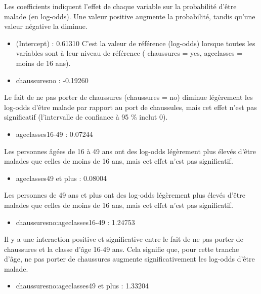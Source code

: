 \documentclass[
]{article}
\providecommand{\tightlist}{%
  \setlength{\itemsep}{0pt}\setlength{\parskip}{0pt}}
\begin{document}
{{Les coefficients indiquent l'effet de chaque variable sur la probabilité
d'être malade (en log-odds). Une valeur positive augmente la
probabilité, tandis qu'une valeur négative la diminue.

\begin{itemize}
\item
  (Intercept) : 0.61310 C'est la valeur de référence (log-odds) lorsque
  toutes les variables sont à leur niveau de référence ( chaussures =
  yes, ageclasses = moins de 16 ans).
\item
  chaussuresno : -0.19260
\end{itemize}

Le fait de ne pas porter de chaussures (chaussures = no) diminue
légèrement les log-odds d'être malade par rapport au port de chaussules,
mais cet effet n'est pas significatif (l'intervalle de confiance à 95 \%
inclut 0).

\begin{itemize}
\tightlist
\item
  ageclasses16-49 : 0.07244
\end{itemize}

Les personnes âgées de 16 à 49 ans ont des log-odds légèrement plus
élevés d'être malades que celles de moins de 16 ans, mais cet effet
n'est pas significatif.

\begin{itemize}
\tightlist
\item
  ageclasses49 et plus : 0.08004
\end{itemize}

Les personnes de 49 ans et plus ont des log-odds légèrement plus élevés
d'être malades que celles de moins de 16 ans, mais cet effet n'est pas
significatif.

\begin{itemize}
\tightlist
\item
  chaussuresno:ageclasses16-49 : 1.24753
\end{itemize}

Il y a une interaction positive et significative entre le fait de ne pas
porter de chaussures et la classe d'âge 16-49 ans. Cela signifie que,
pour cette tranche d'âge, ne pas porter de chaussures augmente
significativement les log-odds d'être malade.

\begin{itemize}
\tightlist
\item
  chaussuresno:ageclasses49 et plus : 1.33204
\end{itemize}

}}
\end{document}
